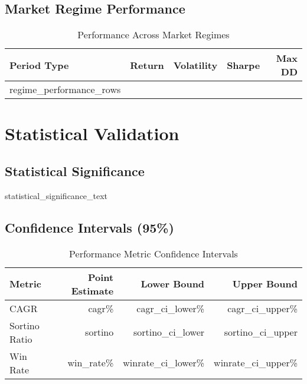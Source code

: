 \documentclass[11pt,a4paper]{article}
\begin{document}
\subsection{Market Regime Performance}
\begin{table}[H]
\centering
\caption{Performance Across Market Regimes}
\begin{tabular}{lrrrr}
\toprule
\textbf{Period Type} & \textbf{Return} & \textbf{Volatility} & \textbf{Sharpe} & \textbf{Max DD} \\
\midrule
{{regime_performance_rows}}
\bottomrule
\end{tabular}
\end{table}

\section{Statistical Validation}

\subsection{Statistical Significance}
{{statistical_significance_text}}

\subsection{Confidence Intervals (95\%)}
\begin{table}[H]
\centering
\caption{Performance Metric Confidence Intervals}
\begin{tabular}{lrrr}
\toprule
\textbf{Metric} & \textbf{Point Estimate} & \textbf{Lower Bound} & \textbf{Upper Bound} \\
\midrule
CAGR & {{cagr}}\% & {{cagr_ci_lower}}\% & {{cagr_ci_upper}}\% \\
Sortino Ratio & {{sortino}} & {{sortino_ci_lower}} & {{sortino_ci_upper}} \\
Win Rate & {{win_rate}}\% & {{winrate_ci_lower}}\% & {{winrate_ci_upper}}\% \\
\bottomrule
\end{tabular}
\end{table}
\end{document}
